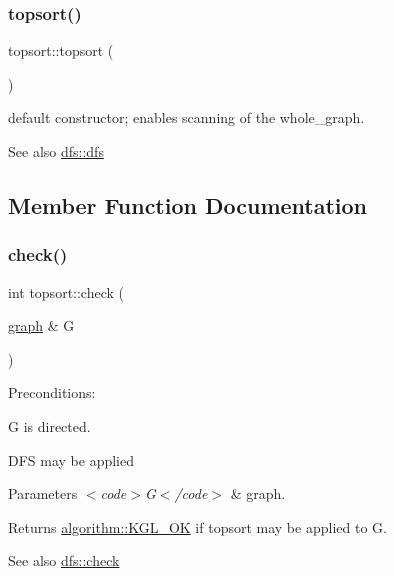 \subsubsection{\texorpdfstring{topsort()}{topsort()}}
{\footnotesize\ttfamily topsort\+::topsort (\begin{DoxyParamCaption}{ }\end{DoxyParamCaption})\hspace{0.3cm}{\ttfamily [inline]}}

default constructor; enables scanning of the whole\+\_\+graph.

\begin{DoxySeeAlso}{See also}
\mbox{\hyperlink{classdfs_a5232bc41ab202b6278a84bd97c803a0d}{dfs\+::dfs}} 
\end{DoxySeeAlso}


\subsection{Member Function Documentation}
\mbox{\label{classtopsort_a777a9a68c4081d22e7b698ed3c515343}} 
\subsubsection{\texorpdfstring{check()}{check()}}
{\footnotesize\ttfamily int topsort\+::check (\begin{DoxyParamCaption}\item[{\mbox{\hyperlink{classgraph}{graph}} \&}]{G }\end{DoxyParamCaption})\hspace{0.3cm}{\ttfamily [virtual]}}

Preconditions\+: 
\begin{DoxyItemize}
\item {\ttfamily G} is directed. 
\item D\+FS may be applied 
\end{DoxyItemize}


\begin{DoxyParams}{Parameters}
{\em $<$code$>$\+G$<$/code$>$} & graph. \\
\hline
\end{DoxyParams}
\begin{DoxyReturn}{Returns}
{\ttfamily \mbox{\hyperlink{classalgorithm_af1a0078e153aa99c24f9bdf0d97f6710aae4c1cd7fe8d8cf4b143241a6e7c31cf}{algorithm\+::\+K\+G\+L\+\_\+\+OK}}} if topsort may be applied to {\ttfamily G}. 
\end{DoxyReturn}
\begin{DoxySeeAlso}{See also}
\mbox{\hyperlink{classdfs_a1af70060897529e67910f589b047e576}{dfs\+::check}} 
\end{DoxySeeAlso}


